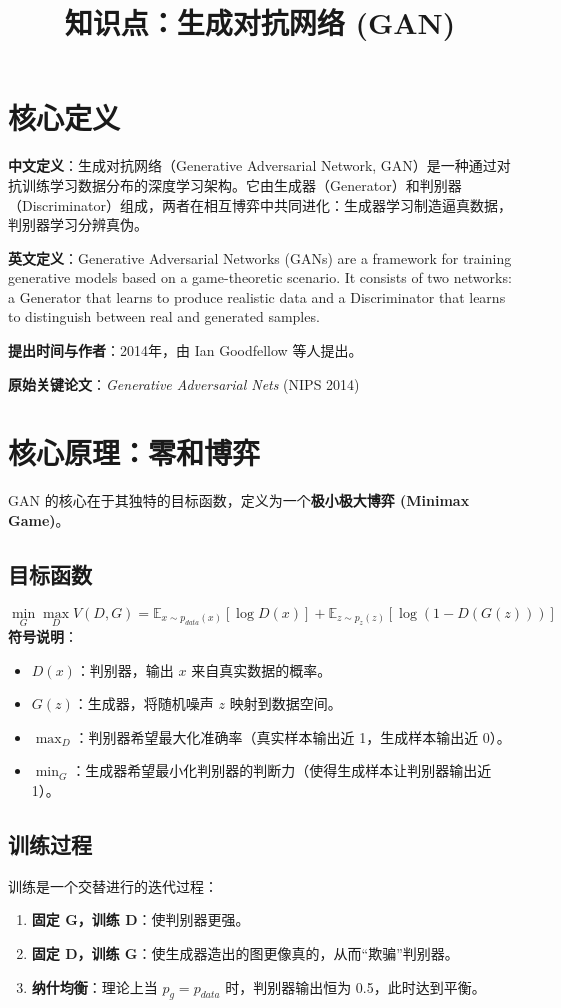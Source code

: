 \documentclass[12pt, a4paper]{article}
\title{知识点：生成对抗网络 (GAN)}
\author{}
\date{}
\begin{document}
\maketitle

\section{核心定义}
\textbf{中文定义}：生成对抗网络（Generative Adversarial Network, GAN）是一种通过对抗训练学习数据分布的深度学习架构。它由生成器（Generator）和判别器（Discriminator）组成，两者在相互博弈中共同进化：生成器学习制造逼真数据，判别器学习分辨真伪。

\textbf{英文定义}：Generative Adversarial Networks (GANs) are a framework for training generative models based on a game-theoretic scenario. It consists of two networks: a Generator that learns to produce realistic data and a Discriminator that learns to distinguish between real and generated samples.

\textbf{提出时间与作者}：2014年，由 Ian Goodfellow 等人提出。

\textbf{原始关键论文}：\textit{Generative Adversarial Nets} (NIPS 2014)

\section{核心原理：零和博弈}
GAN 的核心在于其独特的目标函数，定义为一个\textbf{极小极大博弈 (Minimax Game)}。

\subsection{目标函数}
$$ \min_G \max_D V(D, G) = \mathbb{E}_{x \sim p_{data}(x)}[\log D(x)] + \mathbb{E}_{z \sim p_z(z)}[\log(1 - D(G(z)))] $$
\textbf{符号说明}：
\begin{itemize}
    \item $D(x)$：判别器，输出 $x$ 来自真实数据的概率。
    \item $G(z)$：生成器，将随机噪声 $z$ 映射到数据空间。
    \item $\max_D$：判别器希望最大化准确率（真实样本输出近 1，生成样本输出近 0）。
    \item $\min_G$：生成器希望最小化判别器的判断力（使得生成样本让判别器输出近 1）。
\end{itemize}

\subsection{训练过程}
训练是一个交替进行的迭代过程：
\begin{enumerate}
    \item \textbf{固定 G，训练 D}：使判别器更强。
    \item \textbf{固定 D，训练 G}：使生成器造出的图更像真的，从而“欺骗”判别器。
    \item \textbf{纳什均衡}：理论上当 $p_g = p_{data}$ 时，判别器输出恒为 0.5，此时达到平衡。
\end{enumerate}
\end{document}

